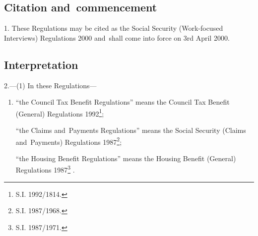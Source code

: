 \documentclass[12pt,a4paper]{article}
\begin{document}
\renewcommand\parthead{— Part I}

\subsection[1. Citation and~commencement]{Citation and~commencement}

1.  These Regulations may be cited as the Social Security (Work-focused Interviews) Regulations 2000 and~shall come into force on 3rd April 2000.

\subsection[2. Interpretation]{Interpretation}

2.—(1)  In these Regulations—
\begin{enumerate}\item[]
%
%
%
%
%
%
%
%

“the Council Tax Benefit Regulations” means the Council Tax Benefit (General) Regulations 1992\footnote{\frenchspacing S.I. 1992/1814.};

“the Claims and~Payments Regulations” means the Social Security (Claims and~Payments) Regulations 1987\footnote{\frenchspacing S.I. 1987/1968.};

“the Housing Benefit Regulations” means the Housing Benefit (General) Regulations 1987\footnote{\frenchspacing S.I. 1987/1971.}%
%
%
%
.
\end{enumerate}
\end{document}

